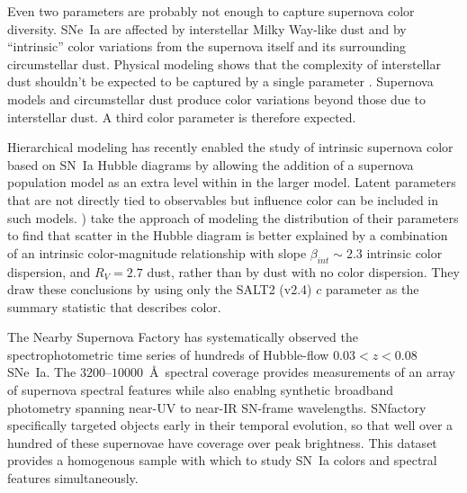 \documentclass[trackchanges]{aastex62}   	%
\begin{document}
Even two parameters are probably not enough to capture supernova color diversity.  SNe~Ia 
are affected by interstellar Milky Way-like dust  and by ``intrinsic'' color variations from the supernova itself and its surrounding circumstellar dust. Physical modeling
shows that the complexity of interstellar dust shouldn't be expected to be captured by a single parameter \citep{2015ApJ...807L..26G,
2017ApJ...836...13H}. Supernova models \citep[e.g.][]{2007ApJ...662..487W,2013MNRAS.436..333S,2014MNRAS.441..532D,2015MNRAS.454.2549B,
2017ApJ...846...58H} and circumstellar dust \citep{2005ApJ...635L..33W,
2008ApJ...686L.103G} produce
color variations beyond those due to interstellar dust. 
A third color
parameter is therefore expected.

Hierarchical modeling has recently enabled
the study of intrinsic supernova color based on SN~Ia Hubble diagrams
by allowing the addition of a supernova population model as an extra level within in the larger model.
Latent parameters that are not directly tied to observables
but  influence color can be included in such models.
\citet{2017ApJ...842...93M} ) take the approach of modeling the distribution of their parameters to find that
scatter in the Hubble diagram is better explained by a combination of 
an intrinsic color-magnitude relationship with slope $\beta_{\mathit{int}}\sim 2.3$ intrinsic
color dispersion,
and
$R_V=2.7$ dust, rather than by dust with no color dispersion.
They draw these conclusions by using only the SALT2 (v2.4)
 $c$
parameter as the summary statistic that describes color.

The Nearby Supernova Factory \citep[SNfactory;][]{2002SPIE.4836...61A} has systematically observed the
spectrophotometric time series of hundreds of Hubble-flow $0.03<z<0.08$ SNe~Ia.   The $3200$--$10000$~\AA\ spectral coverage
provides measurements of an array of supernova spectral features while also enablng synthetic broadband photometry
spanning near-UV to near-IR SN-frame wavelengths.  SNfactory specifically targeted objects
early in their temporal evolution, so that well over a hundred of these supernovae have  coverage over
peak brightness.  This dataset provides a homogenous sample with which to study SN~Ia colors and spectral features simultaneously.
\end{document}
